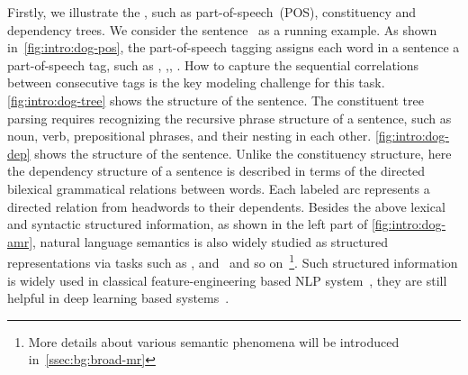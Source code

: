 Firstly, we illustrate the , such as
part-of-speech~(POS), constituency and dependency trees. We consider
the sentence ~as a running example. As shown
in~\autoref{fig:intro:dog-pos}, the part-of-speech tagging assigns
each word in a sentence a part-of-speech tag, such as ,
,, . How to capture the
sequential correlations between consecutive tags is the key modeling
challenge for this task.  \autoref{fig:intro:dog-tree} shows the
 structure of the sentence. The constituent tree
parsing requires recognizing the recursive phrase structure of a
sentence, such as noun, verb, prepositional phrases, and their nesting
in each other. \autoref{fig:intro:dog-dep} shows the  structure of the sentence. Unlike the constituency structure,
here the dependency structure of a sentence is described in terms of
the directed bilexical grammatical relations between words. Each
labeled arc represents a directed relation from headwords to their
dependents. Besides the above lexical and syntactic structured
information, as shown in the left part of \autoref{fig:intro:dog-amr},
natural language semantics is also widely studied as structured
representations via tasks such as ,
 and~ and so
on~\footnote{More details about various semantic phenomena will be
  introduced in~\autoref{ssec:bg:broad-mr}}. Such structured
information is widely used in classical feature-engineering based NLP
system~\citep[\eg,][]{Joh:Nug:08,hovy2010s,punyakanok2008importance},
they are still helpful in deep learning based
systems~\citep{moosavi-strube-2018-using,strubell-etal-2018-linguistically,bowman-etal-2016-fast}.

